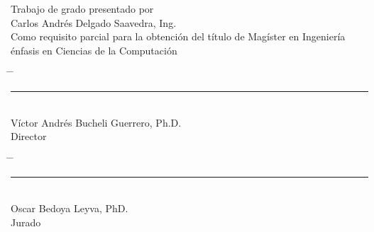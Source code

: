 \vspace*{4cm}
\begin{center}
Trabajo de grado presentado por\\
Carlos Andrés Delgado Saavedra, Ing.\\
Como requisito parcial para la obtención del título de Magíster en Ingeniería énfasis en Ciencias de la Computación
\end{center}
\vfill
\begin{center}
\begin{tabbing}
\hspace{0.05\textwidth} \= \hspace{0.05\textwidth} \= \kill
\rule{70mm}{0.1mm} \>%
\\
Víctor Andrés Bucheli Guerrero, Ph.D.\> %
\\
Director \>%
\end{tabbing}
\end{center}
\vfill
\begin{center}
\begin{tabbing}
\hspace{0.05\textwidth} \= \hspace{0.05\textwidth} \= \kill
\rule{70mm}{0.1mm} \> \rightline{\rule{80mm}{0.1mm}} \\
Oscar Bedoya Leyva, PhD. \> \\
Jurado \> 
\end{tabbing}
\end{center}
\vfill

